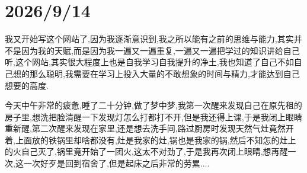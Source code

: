 

\section*{2026/9/14}

我又开始写这个网站了,因为我逐渐意识到,我之所以能有之前的思维与能力,其实并不是因为我的天赋,而是因为我一遍又一遍重复,一遍又一遍把学过的知识讲给自己听,这个网站,其实很大程度上也是自我学习自我提升的净土,我也知道了自己不如自己想的那么聪明,我需要在学习上投入大量的不敢想象的时间与精力,才能达到自己想要的高度.

今天中午非常的疲惫,睡了二十分钟,做了梦中梦,我第一次醒来发现自己在原先租的房子里,想洗把脸清醒一下发现灯怎么打都打不开,但是我还得上课,于是我闭上眼睛重新醒,第二次醒来发现在家里,还是想去洗手间,路过厨房时发现天然气灶竟然开着,上面放的铁锅里却啥都没有,灶是我家的灶,锅也是我家的锅,然后不知怎的灶上的火自己灭了,锅里竟开始了一团火,这太不对劲了,于是我再次闭上眼睛,想再醒一次,这一次好歹是回到宿舍了,但是起床之后非常的劳累....





